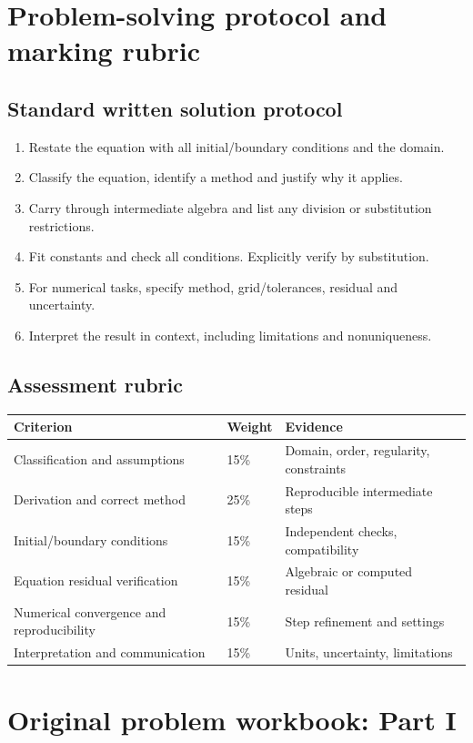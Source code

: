 \documentclass[11pt,letterpaper,oneside]{report}
\theoremstyle{definition}\newtheorem{definition}[theorem]{Definition}
\theoremstyle{remark}\newtheorem{remark}[theorem]{Remark}
\begin{document}
\chapter{Problem-solving protocol and marking rubric}
\section{Standard written solution protocol}
\begin{enumerate}
\item Restate the equation with all initial/boundary conditions and the domain.
\item Classify the equation, identify a method and justify why it applies.
\item Carry through intermediate algebra and list any division or substitution restrictions.
\item Fit constants and check all conditions. Explicitly verify by substitution.
\item For numerical tasks, specify method, grid/tolerances, residual and uncertainty.
\item Interpret the result in context, including limitations and nonuniqueness.
\end{enumerate}
\section{Assessment rubric}
\begin{longtable}{p{}p{}p{}}
\toprule Criterion & Weight & Evidence \\ \midrule\endhead
Classification and assumptions & 15\% & Domain, order, regularity, constraints \\
Derivation and correct method & 25\% & Reproducible intermediate steps \\
Initial/boundary conditions & 15\% & Independent checks, compatibility \\
Equation residual verification & 15\% & Algebraic or computed residual \\
Numerical convergence and reproducibility & 15\% & Step refinement and settings \\
Interpretation and communication & 15\% & Units, uncertainty, limitations \\
\bottomrule
\end{longtable}
\chapter{Original problem workbook: Part I}
\end{document}
